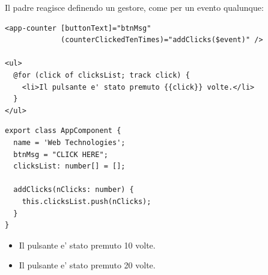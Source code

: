 Il padre reagisce definendo un gestore, come per un evento qualunque:

\begin{affianco}[0.48][c]
\codicepiccolo
\begin{lstlisting}[style=html, name=app.component.html]
<app-counter [buttonText]="btnMsg"
             (counterClickedTenTimes)="addClicks($event)" />

<ul>
  @for (click of clicksList; track click) {
    <li>Il pulsante e' stato premuto {{click}} volte.</li>
  }
</ul>
\end{lstlisting}
\risultato
\begin{immagine}
\end{immagine}
\end{affianco}

\begin{affianco}[0.44][c]
\begin{lstlisting}[style=ts, name=app.component.ts]
export class AppComponent {
  name = 'Web Technologies';
  btnMsg = "CLICK HERE";
  clicksList: number[] = [];

  addClicks(nClicks: number) {
    this.clicksList.push(nClicks);
  }
}
\end{lstlisting}
\risultato
\begin{browser}
  \begin{itemize}[leftmargin=14pt, itemsep=0pt, topsep=4pt]
    \item Il pulsante e' stato premuto 10 volte.
    \item Il pulsante e' stato premuto 20 volte.
  \end{itemize}
\end{browser}
\end{affianco}


